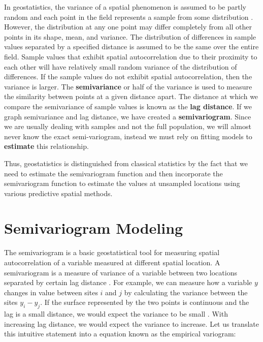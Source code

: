 \documentclass[
]{book}
\begin{document}
In geostatistics, the variance of a spatial phenomenon is assumed to be partly random and each point in the field represents a sample from some distribution \citep{jacquez_spatial_1999}. However, the distribution at any one point may differ completely from all other points in its shape, mean, and variance. The distribution of differences in sample values separated by a specified distance is assumed to be the same over the entire field. Sample values that exhibit spatial autocorrelation due to their proximity to each other will have relatively small random variance of the distribution of differences. If the sample values do not exhibit spatial autocorrelation, then the variance is larger. The \textbf{semivariance} or half of the variance is used to measure the similarity between points at a given distance apart. The distance at which we compare the semivariance of sample values is known as the \textbf{lag distance}. If we graph semivariance and lag distance, we have created a \textbf{semivariogram}. Since we are usually dealing with samples and not the full population, we will almost never know the exact semi-variogram, instead we must rely on fitting models to \textbf{estimate} this relationship.

Thus, geostatistics is distinguished from classical statistics by the fact that we need to estimate the semivariogram function and then incorporate the semivariogram function to estimate the values at unsampled locations using various predictive spatial methods.

\hypertarget{semivariogram-modeling}{%
\section{Semivariogram Modeling}\label{semivariogram-modeling}}

The semivariogram is a basic geostatistical tool for measuring spatial autocorrelation of a variable measured at different spatial location. A semivariogram is a measure of variance of a variable between two locations separated by certain lag distance \citep{isaaks_introduction_1989}. For example, we can measure how a variable \(y\) changes in value between sites \(i\) and \(j\) by calculating the variance between the sites \(y_i-y_j\). If the surface represented by the two points is continuous and the lag is a small distance, we would expect the variance to be small \citep{isaaks_introduction_1989}. With increasing lag distance, we would expect the variance to increase. Let us translate this intuitive statement into a equation known as the empirical variogram:
\end{document}
